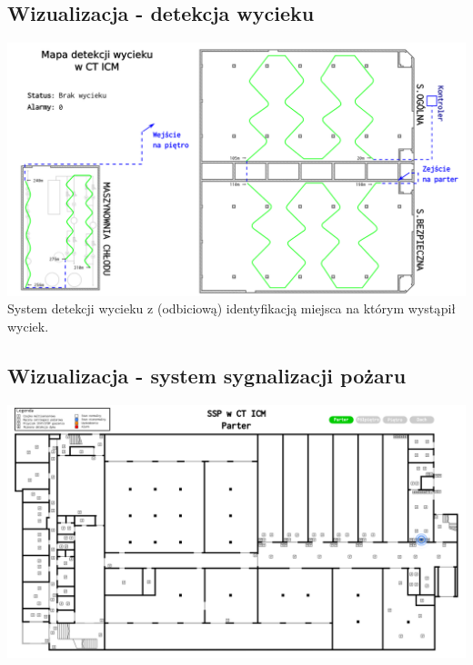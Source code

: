 \documentclass[aspectratio=169]{beamer} %
\begin{document}
\subsection{Wizualizacja - detekcja wycieku}
\begin{frame}[fragile]
\begin{center}\includegraphics[width=.8\textwidth]{monitoring_obiektow_data_center-img/monitoring_dc-detekcja_wycieku}\\
{\small System detekcji wycieku z (odbiciową) identyfikacją miejsca na którym wystąpił wyciek.}\end{center}
\end{frame}

\subsection{Wizualizacja - system sygnalizacji pożaru}
\begin{frame}[fragile]
\begin{center}\includegraphics[width=.8\textwidth]{monitoring_obiektow_data_center-img/monitoring_dc-ssp}\end{center}
\end{frame}
\end{document}
